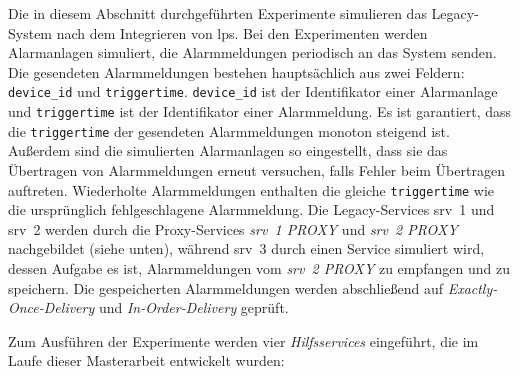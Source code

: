 Die in diesem Abschnitt durchgeführten Experimente simulieren das Legacy-System nach dem Integrieren von \gls{lps}. Bei den Experimenten werden Alarmanlagen simuliert, die Alarmmeldungen periodisch an das System senden. Die gesendeten Alarmmeldungen bestehen hauptsächlich aus zwei Feldern: \texttt{device\_\allowbreak id} und \texttt{triggertime}. \texttt{device\_\allowbreak id} ist der Identifikator einer Alarmanlage und \texttt{triggertime} ist der Identifikator einer Alarmmeldung. Es ist garantiert, dass die \texttt{triggertime} der gesendeten Alarmmeldungen monoton steigend ist. Außerdem sind die simulierten Alarmanlagen so eingestellt, dass sie das Übertra\-gen von Alarmmeldungen erneut versuchen, falls Fehler beim Übertragen auftreten. Wiederholte Alarmmeldungen enthalten die gleiche \texttt{triggertime} wie die ursprünglich fehlgeschlagene Alarmmeldung. Die Legacy-Services \gls{srv}~1 und \gls{srv}~2 werden durch die Proxy-Services \textit{\gls{srv}~1 PROXY} und \textit{\gls{srv}~2 PROXY} nachgebildet (siehe unten), während \gls{srv}~3 durch einen Service simuliert wird, dessen Aufgabe es ist, Alarmmeldungen vom \textit{\gls{srv}~2 PROXY} zu empfangen und zu speichern. Die gespeicherten Alarmmeldungen werden abschließend auf \textit{Exactly-Once-Delivery} und \textit{In-Order-Delivery} geprüft.

\newpage

Zum Ausführen der Experimente werden vier \textit{Hilfsservices} eingeführt, die im Laufe dieser Masterarbeit entwickelt wurden:

